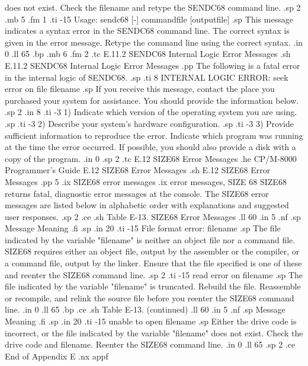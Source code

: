 does not exist.  Check the filename and retype the SENDC68 command line.
.sp 2
.mb 5
.fm 1
.ti -15
Usage:  sendc68  [-] commandfile [outputfile]
.sp
This message indicates a syntax error in the SENDC68 command line.
The correct syntax is given in the error message.  Retype the command line 
using the correct syntax.
.in 0
.ll 65
.bp
.mb 6
.fm 2
.tc         E.11.2  SENDC68 Internal Logic Error Messages
.sh
E.11.2  SENDC68 Internal Logic Error Messages
.pp
The following is a fatal error in the internal logic of SENDC68.  
.sp
.ti 8
INTERNAL LOGIC ERROR:  seek error on file  filename
.sp
If you receive this message, contact the place you purchased your 
system for assistance.  
You should provide the information below.
.sp 2
.in 8
.ti -3
1) Indicate which version of the operating system you are using.
.sp
.ti -3
2) Describe your system's hardware configuration.
.sp
.ti -3
3) Provide sufficient information to reproduce the error.  Indicate 
which program was running at the time the error occurred.  If possible, 
you should also provide a disk with a copy of the program.
.in 0
.sp 2
.tc    E.12 SIZE68 Error Messages
.he CP/M-8000 Programmer's Guide           E.12  SIZE68 Error Messages
.sh
E.12  SIZE68 Error Messages
.pp 5
.ix SIZE68 error messages
.ix error messages, SIZE 68
SIZE68 returns fatal, diagnostic error messages at the console.  The SIZE68
error messages are listed below in alphabetic order with explanations and
suggested user responses.
.sp 2
.ce
.sh
Table E-13.  SIZE68 Error Messages
.ll 60
.in 5
.nf
.sp
Message        Meaning
.fi
.sp
.in 20
.ti -15
File format error:  filename
.sp
The file indicated by the variable "filename" is neither an 
object file nor a command file.  SIZE68 requires either an object file, 
output by the assembler or
the compiler, or a command file, output by the linker.  Ensure that the
file specified is one of these and reenter the SIZE68 command line.
.sp 2
.ti -15
read error on  filename
.sp
The file indicated by the variable "filename" is truncated.  Rebuild the 
file.  Reassemble or recompile, and relink the 
source file before you reenter the SIZE68 command line.
.in 0
.ll 65
.bp
.ce
.sh
Table E-13.  (continued)
.ll 60
.in 5
.nf
.sp
Message        Meaning
.fi
.sp
.in 20
.ti -15
unable to open  filename
.sp
Either the drive code is incorrect, or the file indicated by the 
variable "filename" does not exist.  Check the drive code and filename.  
Reenter the SIZE68 command line.
.in 0
.ll 65
.sp 2
.ce
End of Appendix E
.nx appf
